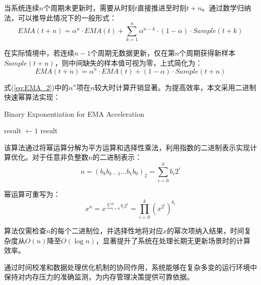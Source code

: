 当系统连续\(n\)个周期未更新时，需要从时刻\(t\)直接推进至时刻\(t+n\)。通过数学归纳法，可以推导此情况下的一般形式：
\begin{equation}
EMA(t+n) = \alpha^n \cdot EMA(t) + \sum_{k=1}^{n} \alpha^{n-k} \cdot (1-\alpha) \cdot Sample(t+k)
\end{equation}

在实际情境中，若连续\(n-1\)个周期无数据更新，仅在第\(n\)个周期获得新样本\(Sample(t+n)\)，则中间缺失的样本值可视为零，上式简化为：
\begin{equation}
\label{eq:EMA_2}
EMA(t+n) = \alpha^n \cdot EMA(t) + (1-\alpha) \cdot Sample(t+n)
\end{equation}

式(\ref{eq:EMA_2})中的\(\alpha^n\)项在\(n\)较大时计算开销显著。为提高效率，本文采用二进制快速幂算法实现：

\begin{algorithm}[htbp]
    \caption{Binary Exponentiation for EMA Acceleration}
    \label{alg:fast_exp}
    \SetAlgoLined
    
    
    result \(\gets 1\)\;
    \Return result\;
\end{algorithm}

该算法通过将幂运算分解为平方运算和选择性乘法，利用指数的二进制表示实现计算优化。对于任意非负整数\(n\)的二进制表示：
\begin{equation}
n = (b_k b_{k-1} \ldots b_1 b_0)_2 = \sum_{i=0}^{k} b_i 2^i
\end{equation}

幂运算可重写为：
\begin{equation}
x^n = x^{\sum_{i=0}^{k} b_i 2^i} = \prod_{i=0}^k (x^{2^i})^{b_i}
\end{equation}

算法仅需检查\(n\)的每个二进制位，并选择性地将对应\(x\)的幂次项纳入结果，时间复杂度从\(O(n)\)降至\(O(\log n)\)，显著提升了系统在处理长期无更新场景时的计算效率。

通过时间校准和数据处理优化机制的协同作用，系统能够在复杂多变的运行环境中保持对内存压力的准确监测，为内存管理决策提供可靠依据。


